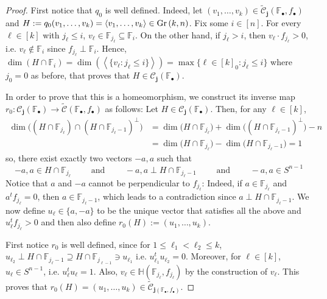 \begin{proof} First notice that $q_0$ is well defined. Indeed, let $(v_1,\ldots,v_k)\in\tilde{\mathcal{C}}_{\mathbf{j}}(\mathbb{F}_{\bullet},f_{\bullet})$ and
$H:=q_0(v_1,\ldots,v_k)=\left<v_1,\ldots,v_k\right>\in\Gr{k}{n}$.
Fix some $i\in[n]$. For every $\ell\in[k]$ with $j_{\ell}\leq i$,  $v_{\ell}\in\mathbb{F}_{j_{\ell}}\subseteq\mathbb{F}_i$. On the other hand, if $j_{\ell}>i$, then $v_{\ell}\cdot f_{j_{\ell}}>0$, i.e. $v_{\ell}\not\in\mathbb{F}_i$ since $f_{j_{\ell}}\perp\mathbb{F}_i$. Hence,
$\dim(H\cap\mathbb{F}_i)=\dim\left(\left<\big\{v_{\ell}:j_{\ell}\leq i\big\}\right>\right)=\max\{\ell\in[k]_0:j_{\ell}\leq i\}$
where $j_0=0$ as before, that proves that $H\in\mathcal{C}_{\mathbf{j}}(\mathbb{F}_{\bullet})$.

In order to prove that this is a homeomorphism, we construct its inverse map $r_0:\mathcal{C}_{\mathbf{j}}(\mathbb{F}_{\bullet})\to\tilde{\mathcal{C}}(\mathbb{F}_{\bullet},f_{\bullet})$ as follows: Let $H\in\mathcal{C}_{\mathbf{j}}(\mathbb{F}_{\bullet})$. Then, for any $\ell\in[k]$,
\begin{align*}
\dim\big(\left(H\cap\mathbb{F}_{j_{\ell}}\right)\cap\left(H\cap\mathbb{F}_{j_{\ell}-1}\right)^{\perp}\big)&=\dim\big(H\cap\mathbb{F}_{j_{\ell}}\big)+\dim\big(\left(H\cap\mathbb{F}_{j_{\ell}-1}\right)^{\perp}\big)-n\\
&=\dim\big(H\cap\mathbb{F}_{j_{\ell}}\big)-\dim\big(H\cap\mathbb{F}_{j_{\ell}-1}\big)=1
\end{align*}
so, there exist exactly two vectors $-a,a$ such that
\[-a,a\in H\cap\mathbb{F}_{j_{\ell}}\qquad\text{ and }\qquad-a,a\perp H\cap\mathbb{F}_{j_{\ell}-1}\qquad\text{ and }\qquad-a,a\in S^{n-1}\]
Notice that $a$ and $-a$ cannot be perpendicular to $f_{j_{\ell}}$: Indeed, if $a\in\mathbb{F}_{j_{\ell}}$ and $a^tf_{j_{\ell}}=0$, then $a\in\mathbb{F}_{j_{\ell}-1}$, which leads to a contradiction since $a\perp H\cap\mathbb{F}_{j_{\ell}-1}$. We now define $u_{\ell}\in\{a,-a\}$ to be the unique vector that satisfies all the above and $u_{\ell}^tf_{j_{\ell}}>0$ and then also define $r_0(H):=(u_1,\ldots,u_k)$.

First notice $r_0$ is well defined, since for $1\leq\ell_1<\ell_2\leq k$,
$u_{\ell_2}\perp H\cap\mathbb{F}_{j_{\ell}-1}\supseteq H\cap\mathbb{F}_{j_{\ell-1}}\ni u_{\ell_1}$
i.e. $u_{\ell_1}^tu_{\ell_2}=0$. Moreover, for $\ell\in[k]$, $u_{\ell}\in S^{n-1}$, i.e. $u_{\ell}^tu_{\ell}=1$. Also, $v_{\ell}\in\mathbb{H}(\mathbb{F}_{j_{\ell}},f_{j_{\ell}})$ by the construction of $v_{\ell}$. This proves that $r_0(H)=(u_1,\ldots,u_k)\in\tilde{\mathcal{C}}_{\mathbf{j}(\mathbb{F}_{\bullet},f_{\bullet})}$.


\end{proof}
